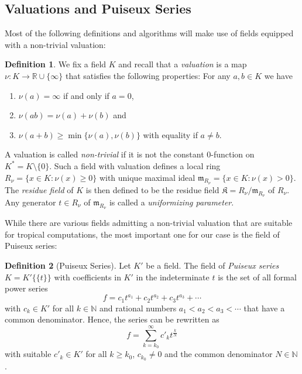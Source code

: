 \documentclass[
  paper=a4,
  titlepage,
  bibliography=totoc,
  listof=totoc,
  pagesize=pdftex
]{scrartcl}
\numberwithin{figure}{section}
\numberwithin{equation}{section}
\numberwithin{table}{section}
\newcommand*\setR{\mathds{R}}
\newcommand*\setN{\mathds{N}}
\newcommand*\puiseux[2]{#1\{\!\{#2\}\!\}}
\theoremstyle{definition}
\newtheorem{definition}{Definition}
\numberwithin{definition}{section}
\begin{document}
\subsection{Valuations and Puiseux Series}

Most of the following definitions and algorithms will make use of fields equipped with a
non-trivial valuation:

\begin{definition} \label{def:val}
  We fix a field $K$ and recall that a \emph{valuation} is a map $\nu:K\to \setR \cup
  \{\infty\}$ that satisfies the following properties: For any $a, b \in K$ we have
  \begin{enumerate}
    \item $\nu(a) = \infty$ if and only if $a=0$,
    \item $\nu(ab) = \nu(a)+\nu(b)$ and
    \item $\nu(a+b) \geq \min\{\nu(a), \nu(b)\}$ with equality if $a\neq b$.
      \label{def:val:eq}
  \end{enumerate}
\end{definition}

A valuation is called \emph{non-trivial} if it is not the constant 0-function on $K^* =
K\setminus\{0\}$. Such a field with valuation defines a local ring $R_\nu = \{ x \in K :
\nu(x) \geq 0 \}$ with unique maximal ideal $\mathfrak m_{R_\nu} = \{ x \in K : \nu(x) > 0
\}$. The \emph{residue field} of $K$ is then defined to be the residue field $\mathfrak K
= R_\nu/\mathfrak m_{R_\nu}$ of $R_\nu$. Any generator $t \in R_\nu$ of $\mathfrak
m_{R_\nu}$ is called a \emph{uniformizing parameter}.

While there are various fields admitting a non-trivial valuation that
are suitable for tropical computations, the most important one for our case is the field
of Puiseux series:

\begin{definition}[Puiseux Series]
  \label{def:puiseux}
  Let $K'$ be a field. The field of \emph{Puiseux series} $K = \puiseux{K'}{t}$ with
  coefficients in $K'$ in the indeterminate $t$ is the set of all formal power series
  \begin{equation} \label{eq:puiseux1}
    f = c_1 t^{a_1} + c_2 t^{a_2} + c_3 t^{a_3} + \cdots
  \end{equation}
  with $c_k \in K'$ for all $k \in \setN$ and rational numbers $a_1 < a_2 < a_3 < \cdots$
  that have a common denominator. Hence, the series can be rewritten as
  \begin{equation} \label{eq:puiseux2}
    f = \sum_{k = k_0}^\infty c'_k t^{\frac kN}
  \end{equation}
  with suitable $c'_k \in K'$ for all $k\geq k_0$, $c_{k_0}\neq0$ and the common
  denominator $N \in \setN$.
\end{definition}
\end{document}
